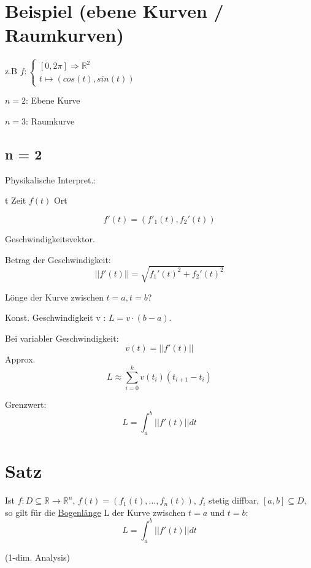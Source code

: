 \documentclass[a4paper, openany]{book}
\begin{document}
        \section{Beispiel (ebene Kurven / Raumkurven)}

        z.B $f : \begin{cases} [0, 2 \pi ] \Rightarrow \mathbb{R}^2 \\ t \mapsto (cos(t), sin(t)) \end{cases}$

        \par \medskip

        $n = 2$: Ebene Kurve

        $n = 3$:  Raumkurve

        \subsection*{n = 2}

        Physikalische Interpret.: 

        t Zeit $f(t)$ Ort

        \[ f'(t) = (f'_1(t), f_2'(t)) \]

        Geschwindigkeitsvektor.

        Betrag der Geschwindigkeit: \[ ||f'(t)|| = \sqrt{f_1'(t)^2 + f_2'(t)^2} \]

        Lönge der Kurve zwischen $t = a, t = b$?

        \par \medskip

        Konst. Geschwindigkeit v : $L = v \cdot (b-a)$.

        \par \medskip

        Bei variabler Geschwindigkeit: \[ v(t) = || f'(t)|| \] Approx. \[ L \approx \sum_{i=0}^k v(t_i) (t_{i+1} - t_i) \]

        Grenzwert: \[ L = \int_a^b ||f'(t)|| dt \]

        \section{Satz}

        Ist $f : D \subseteq \mathbb{R} \rightarrow \mathbb{R}^n$, $f(t) = (f_1(t), ..., f_n(t))$, $f_i$ stetig diffbar, $[a,b] \subseteq D$, so gilt für die \underline{Bogenlänge} L der Kurve zwischen $t = a$ und $t = b$: \[ L = \int_a^b ||f'(t)|| dt \]

        (1-dim. Analysis)
\end{document}
